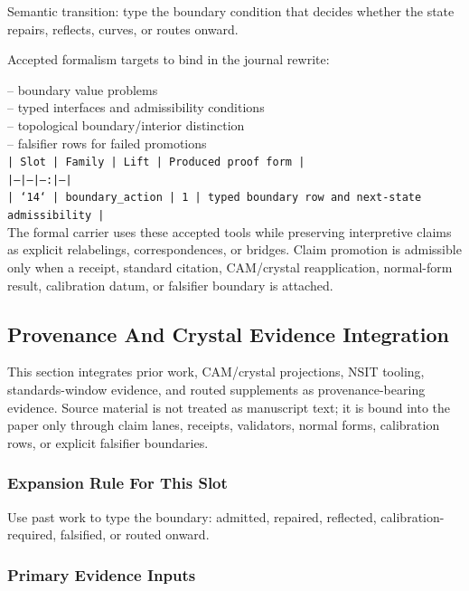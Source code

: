 \documentclass[11pt]{article}
\begin{document}
Semantic transition: type the boundary condition that decides whether the state repairs, reflects, curves, or routes onward.

Accepted formalism targets to bind in the journal rewrite:

\noindent{}-- boundary value problems\\
\noindent{}-- typed interfaces and admissibility conditions\\
\noindent{}-- topological boundary/interior distinction\\
\noindent{}-- falsifier rows for failed promotions\\

\noindent\texttt{| Slot | Family | Lift | Produced proof form |}\\
\noindent\texttt{|---|---|---:|---|}\\
\noindent\texttt{| `14` | boundary\_action | 1 | typed boundary row and next-state admissibility |}\\

The formal carrier uses these accepted tools while preserving interpretive
claims as explicit relabelings, correspondences, or bridges. Claim promotion is admissible only when a receipt, standard citation,
CAM/crystal reapplication, normal-form result, calibration datum, or falsifier
boundary is attached.

\subsection*{Provenance And Crystal Evidence Integration}

This section integrates prior work, CAM/crystal projections, NSIT tooling,
standards-window evidence, and routed supplements as provenance-bearing
evidence. Source material is not treated as manuscript text; it is bound into
the paper only through claim lanes, receipts, validators, normal forms,
calibration rows, or explicit falsifier boundaries.

\subsubsection*{Expansion Rule For This Slot}

Use past work to type the boundary: admitted, repaired, reflected, calibration-required, falsified, or routed onward.

\subsubsection*{Primary Evidence Inputs}
\end{document}
